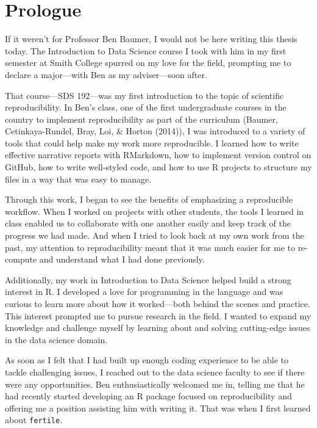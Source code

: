 \documentclass[12pt,twoside]{reedthesis}
\begin{document}
\mainmatter %
\pagestyle{fancyplain} %

\hypertarget{prologue}{%
\chapter*{Prologue}\label{prologue}}

If it weren't for Professor Ben Baumer, I would not be here writing this thesis today. The Introduction to Data Science course I took with him in my first semester at Smith College spurred on my love for the field, prompting me to declare a major---with Ben as my adviser---soon after.

That course---SDS 192---was my first introduction to the topic of scientific reproducibility. In Ben's class, one of the first undergraduate courses in the country to implement reproducibility as part of the curriculum (Baumer, Cetinkaya-Rundel, Bray, Loi, \& Horton (2014)), I was introduced to a variety of tools that could help make my work more reproducible. I learned how to write effective narrative reports with RMarkdown, how to implement version control on GitHub, how to write well-styled code, and how to use R projects to structure my files in a way that was easy to manage.

Through this work, I began to see the benefits of emphasizing a reproducible workflow. When I worked on projects with other students, the tools I learned in class enabled us to collaborate with one another easily and keep track of the progress we had made. And when I tried to look back at my own work from the past, my attention to reproducibility meant that it was much easier for me to re-compute and understand what I had done previously.

Additionally, my work in Introduction to Data Science helped build a strong interest in R. I developed a love for programming in the language and was curious to learn more about how it worked---both behind the scenes and practice. This interest prompted me to pursue research in the field. I wanted to expand my knowledge and challenge myself by learning about and solving cutting-edge issues in the data science domain.

As soon as I felt that I had built up enough coding experience to be able to tackle challenging issues, I reached out to the data science faculty to see if there were any opportunities. Ben enthusiastically welcomed me in, telling me that he had recently started developing an R package focused on reproducibility and offering me a position assisting him with writing it. That was when I first learned about \texttt{fertile}.
\end{document}
